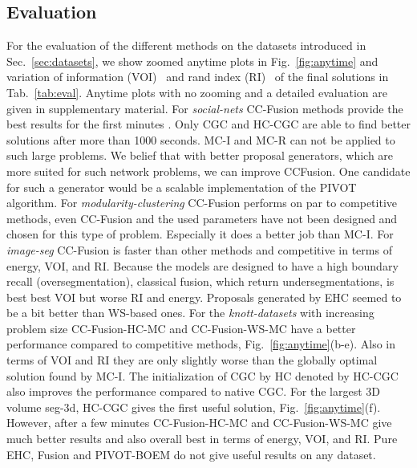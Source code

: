 \subsection{Evaluation}
For the evaluation of the different methods on the datasets introduced in Sec.~\ref{sec:datasets},
we show zoomed anytime plots in  Fig.~\ref{fig:anytime} and variation of information (VOI)~\cite{meila-2003}
and rand index (RI)~\cite{rand-1971} of the final solutions in Tab.~\ref{tab:eval}.
Anytime plots with no zooming and a detailed evaluation are given in supplementary material. 
%
For \emph{social-nets} CC-Fusion methods provide the best results for the first minutes .
Only CGC and HC-CGC are able to find better solutions after more than 1000 seconds.
MC-I and MC-R can not be applied to such large problems.
We belief that with better proposal generators, which are more suited for such network problems,
we can improve CCFusion. One candidate for such a generator would be a scalable implementation of the 
PIVOT algorithm.
%
For \emph{modularity-clustering} CC-Fusion performs on par to competitive methods, even CC-Fusion 
and the used parameters have not been designed and chosen for this type of problem.
Especially it does a better job than MC-I.
%
For \emph{image-seg} CC-Fusion is faster than other methods and competitive in terms of energy, VOI, and RI.
Because  the models are designed to have a high boundary recall (oversegmentation), 
classical fusion, which return undersegmentations, is best best VOI but worse RI and energy.
Proposals generated by EHC seemed to be a bit better than WS-based ones.
%
For the \emph{knott-datasets}
with increasing problem size CC-Fusion-HC-MC and CC-Fusion-WS-MC have a better performance compared to competitive methods, \cf Fig.~\ref{fig:anytime}(b-e).
Also in terms of VOI and RI they are only slightly worse than the globally optimal solution found by MC-I.
The initialization of CGC by HC denoted by HC-CGC also improves the performance compared to native CGC.
For the largest 3D volume seg-3d, HC-CGC gives the first useful solution, \cf  Fig.~\ref{fig:anytime}(f).
However, after a few minutes  CC-Fusion-HC-MC and CC-Fusion-WS-MC give much better results and also overall best in terms of energy, VOI, and RI.
%
Pure EHC, Fusion and PIVOT-BOEM do not give useful results on any dataset.
